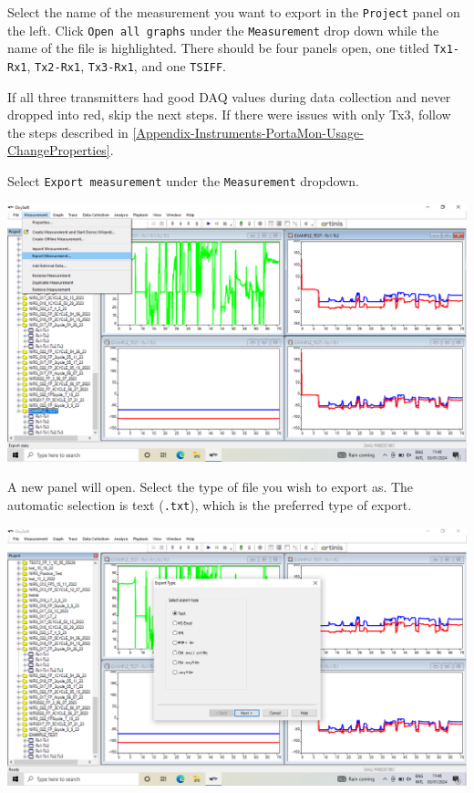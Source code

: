 \documentclass[
]{book}
\begin{document}
Select the name of the measurement you want to export in the \texttt{Project} panel on the left. Click \texttt{Open\ all\ graphs} under the \texttt{Measurement} drop down while the name of the file is highlighted. There should be four panels open, one titled \texttt{Tx1-Rx1}, \texttt{Tx2-Rx1}, \texttt{Tx3-Rx1}, and one \texttt{TSIFF}.

If all three transmitters had good DAQ values during data collection and never dropped into red, skip the next steps. If there were issues with only Tx3, follow the steps described in \ref{Appendix-Instruments-PortaMon-Usage-ChangeProperties}.

Select \texttt{Export\ measurement} under the \texttt{Measurement} dropdown.

\includegraphics[width=1\linewidth]{images/exportmeasurement/1_selectmeasurementtoexport}

A new panel will open. Select the type of file you wish to export as. The automatic selection is text (\texttt{.txt}), which is the preferred type of export.

\includegraphics[width=1\linewidth]{images/exportmeasurement/2_selecttypeofexport}
\end{document}

